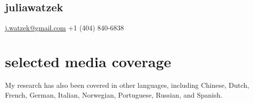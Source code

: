 \documentclass[]{friggeri-cv}
\begin{document}


\begin{aside}
  \section{{\normalfont julia}watzek}
    \href{mailto:j.watzek@gmail.com}{j.watzek@gmail.com}
    +1 (404) 840-6838
\end{aside}



\section{selected media coverage}
\vspace{-.1cm}
{\small{} My research has also been covered in other languages, including Chinese, Dutch,  French, German, Italian, Norwegian, Portuguese, Russian, and Spanish.}\\[.7cm]
\end{document}
